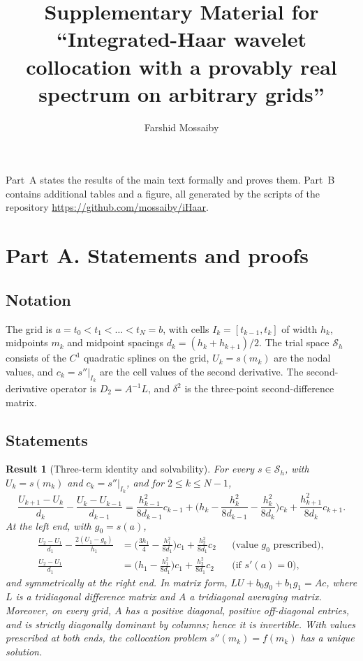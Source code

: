 \documentclass[11pt]{article}
\title{Supplementary Material for\\ ``Integrated-Haar wavelet collocation with a provably real spectrum on arbitrary grids''}
\author{Farshid Mossaiby}
\date{}
\newif\ifincludeproof \includeprooftrue
\newtheorem{result}{Result}
\begin{document}
\maketitle
\noindent Part~A states the results of the main text formally and proves them. Part~B contains additional
tables and a figure, all generated by the scripts of the repository \url{https://github.com/mossaiby/iHaar}.

\ifincludeproof
\section*{Part A. Statements and proofs}
\subsection*{Notation}
The grid is $a=t_0<t_1<\dots<t_N=b$, with cells $I_k=[t_{k-1},t_k]$ of width $h_k$, midpoints $m_k$ and midpoint
spacings $d_k=(h_k+h_{k+1})/2$. The trial space $\mathcal S_h$ consists of the $C^1$ quadratic splines on the
grid, $U_k=s(m_k)$ are the nodal values, and $c_k=s''|_{I_k}$ are the cell values of the second derivative.
The second-derivative operator is $D_2=A^{-1}L$, and $\delta^2$ is the three-point second-difference matrix.

\subsection*{Statements}
\begin{result}[Three-term identity and solvability]\label{thm:identity}
For every $s\in\mathcal S_h$, with $U_k=s(m_k)$ and $c_k=s''|_{I_k}$, and for $2\le k\le N-1$,
\begin{equation}\label{eq:interior}
\frac{U_{k+1}-U_k}{d_k}-\frac{U_k-U_{k-1}}{d_{k-1}}
=\frac{h_{k-1}^2}{8d_{k-1}}c_{k-1}+\Big(h_k-\frac{h_k^2}{8d_{k-1}}-\frac{h_k^2}{8d_k}\Big)c_k+\frac{h_{k+1}^2}{8d_k}c_{k+1}.
\end{equation}
At the left end, with $g_0=s(a)$,
\begin{align}
\frac{U_2-U_1}{d_1}-\frac{2(U_1-g_0)}{h_1}&=\Big(\frac{3h_1}{4}-\frac{h_1^2}{8d_1}\Big)c_1+\frac{h_2^2}{8d_1}c_2 &&\text{(value $g_0$ prescribed)},\label{eq:dirrow}\\
\frac{U_2-U_1}{d_1}&=\Big(h_1-\frac{h_1^2}{8d_1}\Big)c_1+\frac{h_2^2}{8d_1}c_2 &&\text{(if } s'(a)=0),\label{eq:neurow}
\end{align}
and symmetrically at the right end. In matrix form, $LU+b_0g_0+b_1g_1=Ac$, where $L$ is a tridiagonal
difference matrix and $A$ a tridiagonal averaging matrix.
Moreover, on every grid, $A$ has a positive diagonal, positive off-diagonal entries, and is strictly diagonally
dominant by columns; hence it is invertible. With values prescribed at both ends, the collocation
problem $s''(m_k)=f(m_k)$ has a unique solution.
\end{result}
\end{document}
